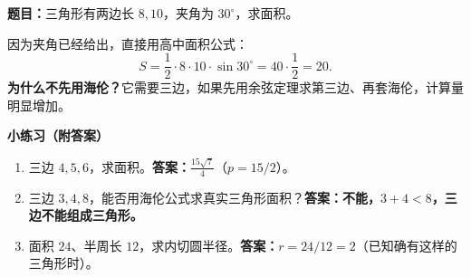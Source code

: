 \begin{examplebox}
\begin{minipage}{\linewidth}
  \textbf{题目：}三角形有两边长 $8,10$，夹角为 $30^\circ$，求面积。


\end{minipage}\par
  因为夹角已经给出，直接用高中面积公式：
  \[
   S=\frac12\cdot8\cdot10\cdot\sin30^\circ
    =40\cdot\frac12=\boxed{20}.
  \]
  \textbf{为什么不先用海伦？}它需要三边，如果先用余弦定理求第三边、再套海伦，计算量明显增加。

  \medskip
  \textbf{\textcolor{CExample}{小练习（附答案）}}
  \begin{enumerate}[leftmargin=*,itemsep=0.2em]
   \item 三边 $4,5,6$，求面积。\quad\textbf{答案：}$\displaystyle \frac{15\sqrt7}{4}$（$p=15/2$）。
   \item 三边 $3,4,8$，能否用海伦公式求真实三角形面积？\quad\textbf{答案：不能，$3+4<8$，三边不能组成三角形。}
   \item 面积 $24$、半周长 $12$，求内切圆半径。\quad\textbf{答案：}$r=24/12=2$（已知确有这样的三角形时）。
  \end{enumerate}
\end{examplebox}

